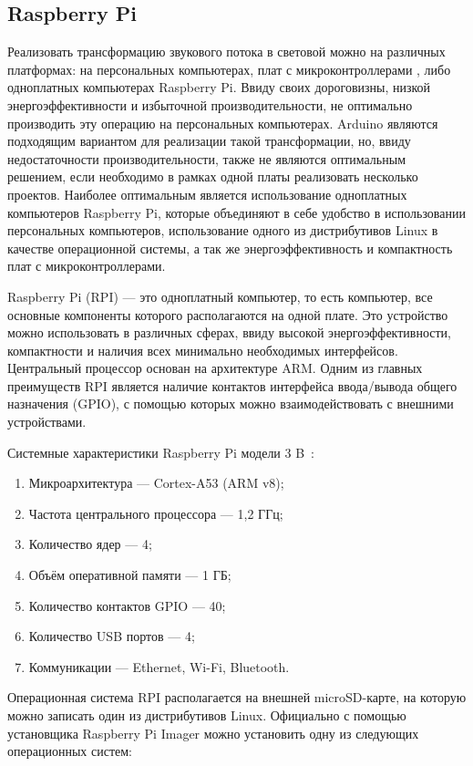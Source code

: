 \subsection{Raspberry Pi}

Реализовать трансформацию звукового потока в световой можно на различных платформах: на персональных компьютерах, плат с микроконтроллерами , либо одноплатных компьютерах Raspberry Pi. Ввиду своих дороговизны, низкой энергоэффективности и избыточной производительности, не оптимально производить эту операцию на персональных компьютерах. Arduino являются подходящим вариантом для реализации такой трансформации, но, ввиду недостаточности производительности, также не являются оптимальным решением, если необходимо в рамках одной платы реализовать несколько проектов. Наиболее оптимальным является использование одноплатных компьютеров Raspberry Pi, которые объединяют в себе удобство в использовании персональных компьютеров, использование одного из дистрибутивов Linux в качестве операционной системы, а так же энергоэффективность и компактность плат с микроконтроллерами.

Raspberry Pi (RPI) --- это одноплатный компьютер, то есть компьютер, все основные компоненты которого располагаются на одной плате. Это устройство можно использовать в различных сферах, ввиду высокой энергоэффективности, компактности и наличия всех минимально необходимых интерфейсов. Центральный процессор основан на архитектуре ARM. Одним из главных преимуществ RPI является наличие контактов интерфейса ввода/вывода общего назначения (GPIO), с помощью которых можно взаимодействовать с внешними устройствами.

Системные характеристики Raspberry Pi модели 3 B~\cite{rpi-site}:

\begin{enumerate}
  \item Микроархитектура --- Cortex-A53 (ARM v8);
  \item Частота центрального процессора --- 1,2 ГГц;
  \item Количество ядер --- 4;
  \item Объём оперативной памяти --- 1 ГБ;
  \item Количество контактов GPIO --- 40;
  \item Количество USB портов --- 4;
  \item Коммуникации --- Ethernet, Wi-Fi, Bluetooth.
\end{enumerate}

Операционная система RPI располагается на внешней microSD-карте, на которую можно записать один из дистрибутивов Linux. Официально с помощью установщика Raspberry Pi Imager можно установить одну из следующих операционных систем:

